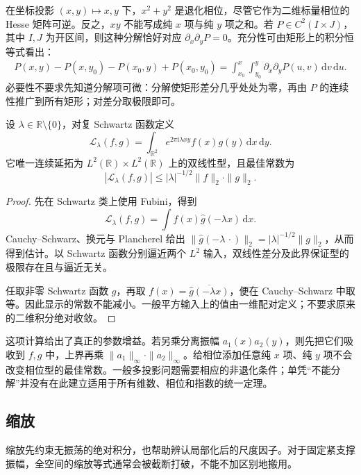 在坐标投影 \((x,y)\mapsto x,y\) 下，\(x^2+y^2\) 是退化相位，尽管它作为二维标量相位的 Hesse 矩阵可逆。反之，\(xy\) 不能写成纯 \(x\) 项与纯 \(y\) 项之和。若 \(P\in C^2(I\times J)\)，其中 \(I,J\) 为开区间，则这种分解恰好对应 \(\partial_x\partial_yP=0\)。充分性可由矩形上的积分恒等式看出：
\[
 \begin{aligned}
 P(x,y)-P(x,y_0)-P(x_0,y)+P(x_0,y_0)
 =\int_{x_0}^x\int_{y_0}^y
       \partial_x\partial_yP(u,v)\,\mathrm dv\,\mathrm du.
 \end{aligned}
\]
必要性不要求先知道分解项可微：分解使矩形差分几乎处处为零，再由 \(P\) 的连续性推广到所有矩形；对差分取极限即可。

\begin{proposition}[混合二次相位的平方估计]\label{b2:prop:25-mixed-phase}
设 \(\lambda\in\mathbb R\setminus\{0\}\)，对复 Schwartz 函数定义
\[
 \mathcal L_\lambda(f,g)
 =\int_{\mathbb R^2}e^{2\pi\mathrm i\lambda xy}
                       f(x)g(y)\,\mathrm dx\,\mathrm dy.
\]
它唯一连续延拓为 \(L^2(\mathbb R)\times L^2(\mathbb R)\) 上的双线性型，且最佳常数为
\[
 |\mathcal L_\lambda(f,g)|
 \leq|\lambda|^{-1/2}\|f\|_2\cdot\|g\|_2.
\]
\end{proposition}
\begin{proof}
先在 Schwartz 类上使用 Fubini，得到
\[
 \mathcal L_\lambda(f,g)=\int f(x)\widehat g(-\lambda x)\,\mathrm dx.
\]
Cauchy--Schwarz、换元与 Plancherel 给出
\(\|\widehat g(-\lambda\,\cdot)\|_2=|\lambda|^{-1/2}\|g\|_2\)，从而得到估计。以 Schwartz 函数分别逼近两个 \(L^2\) 输入，双线性差分及此界保证型的极限存在且与逼近无关。

任取非零 Schwartz 函数 \(g\)，再取
\(f(x)=\overline{\widehat g(-\lambda x)}\)，便在 Cauchy--Schwarz 中取等。因此显示的常数不能减小。一般平方输入上的值由一维配对定义；不要求原来的二维积分绝对收敛。
\end{proof}

这项计算给出了真正的参数增益。若另乘分离振幅 \(a_1(x)a_2(y)\)，则先把它们吸收到 \(f,g\) 中，上界再乘 \(\|a_1\|_\infty\cdot\|a_2\|_\infty\)。给相位添加任意纯 \(x\) 项、纯 \(y\) 项不会改变相位型的最佳常数。一般多投影问题需要相应的非退化条件；单凭“不能分解”并没有在此建立适用于所有维数、相位和指数的统一定理。

\subsection{缩放}
\label{b2:subsec:250103}

缩放先约束无振荡的绝对积分，也帮助辨认局部化后的尺度因子。对于固定紧支撑振幅，全空间的缩放等式通常会被截断打破，不能不加区别地搬用。

